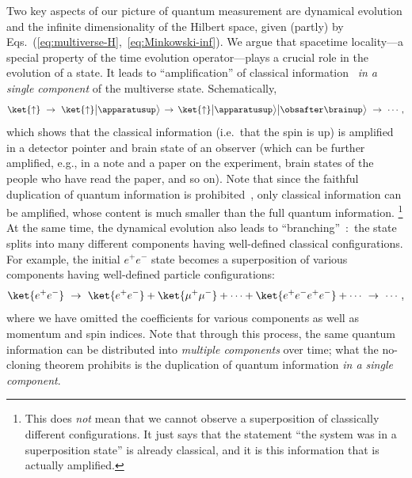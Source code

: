 \documentclass[12pt]{article}
\begin{document}
Two key aspects of our picture of quantum measurement are dynamical 
evolution and the infinite dimensionality of the Hilbert space, given 
(partly) by Eqs.~(\ref{eq:multiverse-H},~\ref{eq:Minkowski-inf}).  We 
argue that spacetime locality---a special property of the time evolution 
operator---plays a crucial role in the evolution of a state.  It leads 
to ``amplification'' of classical information~\cite{q-Darwinism} {\it 
in a single component} of the multiverse state.  Schematically,
%
\begin{equation}
  \ket{\uparrow} \,\,\rightarrow\,\, 
    \ket{\uparrow} \bigl|\apparatusup\bigr> \,\rightarrow\, 
    \ket{\uparrow} \bigl|\apparatusup\bigr> \bigl|\obsafter\brainup\bigr> 
    \,\,\rightarrow\,\, \cdots,
\label{eq:amplification}
\end{equation}
%
which shows that the classical information (i.e.\ that the spin is up) 
is amplified in a detector pointer and brain state of an observer 
(which can be further amplified, e.g., in a note and a paper on the 
experiment, brain states of the people who have read the paper, and 
so on).  Note that since the faithful duplication of quantum information 
is prohibited~\cite{Wootters:1982zz}, only classical information can 
be amplified, whose content is much smaller than the full quantum 
information.%
\footnote{This does {\it not} mean that we cannot observe a superposition 
 of classically different configurations.  It just says that the 
 statement ``the system was in a superposition state'' is already 
 classical, and it is this information that is actually amplified.}
At the same time, the dynamical evolution also leads to 
``branching''~\cite{Everett:1957hd}:\ the state splits into many 
different components having well-defined classical configurations. 
For example, the initial $e^+ e^-$ state becomes a superposition 
of various components having well-defined particle configurations:
%
\begin{equation}
  \ket{e^+ e^-} \,\,\rightarrow\,\, 
  \ket{e^+ e^-} + \ket{\mu^+ \mu^-} + \cdots 
  + \ket{e^+ e^- e^+ e^-} + \cdots 
  \,\,\rightarrow\,\, \cdots,
\label{eq:branching}
\end{equation}
%
where we have omitted the coefficients for various components as well 
as momentum and spin indices.  Note that through this process, the same 
quantum information can be distributed into {\it multiple components} 
over time; what the no-cloning theorem prohibits is the duplication of 
quantum information {\it in a single component}.
\end{document}
